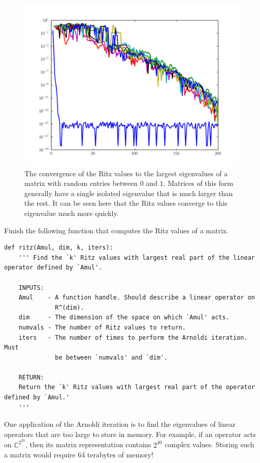\begin{figure}
\includegraphics[width=\textwidth]{rand_vals_conv.pdf}
\caption{The convergence of the Ritz values to the largest eigenvalues of a matrix with random entries between $0$ and $1$.
Matrices of this form generally have a single isolated eigenvalue that is much larger than the rest.
It can be seen here that the Ritz values converge to this eigenvalue much more quickly.}
\label{fig:arnoldi_random_val_conv}
\end{figure}

\begin{problem}\label{prob:ritz}
Finish the following function that computes the Ritz values of a matrix.
\begin{lstlisting}
def ritz(Amul, dim, k, iters):
    ''' Find the `k' Ritz values with largest real part of the linear operator defined by `Amul'.
    
    INPUTS:
    Amul    - A function handle. Should describe a linear operator on 
              R^(dim).
    dim     - The dimension of the space on which `Amul' acts.
    numvals - The number of Ritz values to return.
    iters   - The number of times to perform the Arnoldi iteration. Must 
              be between `numvals' and `dim'.
    
    RETURN:
    Return the `k' Ritz values with largest real part of the operator defined by `Amul.' 
    '''
\end{lstlisting}
\end{problem}

One application of the Arnoldi iteration is to find the eigenvalues of linear operators that are too large to store in memory.
For example, if an operator acts on $\mathbb{C}^{2^{20}}$, then its matrix representation contains $2^{40}$ complex values.
Storing such a matrix would require 64 terabytes of memory!

